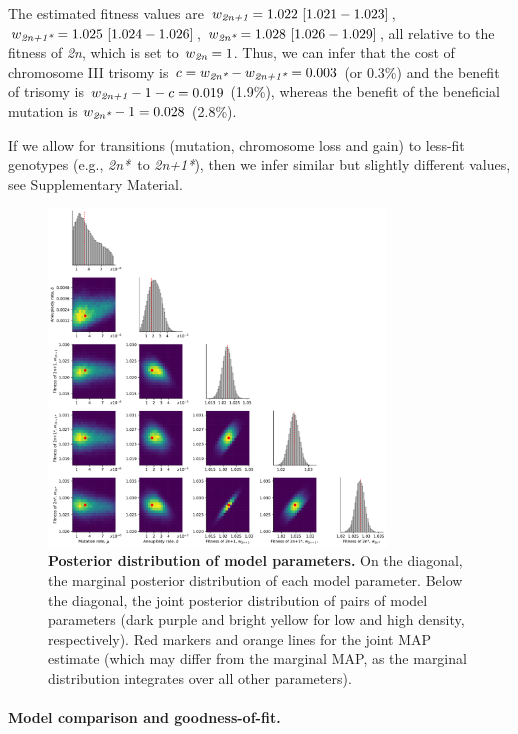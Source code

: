 \documentclass[12pt]{extarticle}
\newcommand{\euwt}{\emph{2n}}
\newcommand{\anwt}{\emph{2n+1}}
\newcommand{\eumt}{\emph{2n*}}
\newcommand{\anmt}{\emph{2n+1*}}
\begin{document}
The estimated fitness values are $w_{\anwt}=1.022\ [1.021-1.023]$,
$w_{\anmt}=1.025\ [1.024-1.026]$,
$w_{\eumt}=1.028\ [1.026-1.029]$, all relative to the fitness of \euwt, which is set to $w_{\euwt}=1$. 
Thus, we can infer that the cost of chromosome III trisomy is $c = w_{\eumt}-w_{\anmt} = 0.003$ (or 0.3\%) and the benefit of trisomy is $w_{\anwt}-1-c=0.019$ (1.9\%), whereas the benefit of the beneficial mutation is $w_{\eumt}-1=0.028$ (2.8\%).

If we allow for transitions (mutation, chromosome loss and gain) to less-fit genotypes (e.g., \eumt\ to \anmt), then we infer similar but slightly different values, see Supplementary Material.

\begin{figure}[h]
  \centering
\includegraphics[width=0.8\textwidth]{../figures/posterior.pdf}
  \caption{
  \textbf{Posterior distribution of model parameters.}
On the diagonal, the marginal posterior distribution of each model parameter. 
Below the diagonal, the joint posterior distribution of pairs of model parameters (dark purple and bright yellow for low and high density, respectively). Red markers and orange lines for the joint MAP estimate (which may differ from the marginal MAP, as the marginal distribution integrates over all other parameters).
} 
  \label{fig:posterior}
\end{figure}

\paragraph{Model comparison and goodness-of-fit.}
\end{document}
